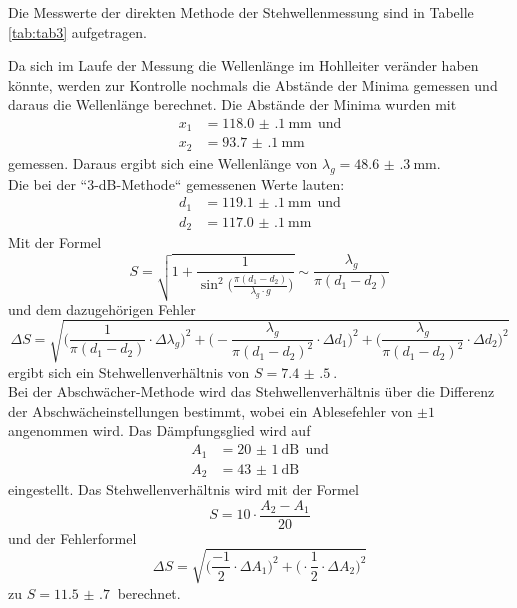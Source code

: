 Die Messwerte der direkten Methode der Stehwellenmessung sind in Tabelle \ref{tab:tab3} aufgetragen.

Da sich im Laufe der Messung die Wellenlänge im Hohlleiter veränder haben könnte, werden zur Kontrolle nochmals
die Abstände der Minima gemessen und daraus die Wellenlänge berechnet. Die Abstände der Minima wurden mit
\begin{align*}
  x_1&=\SI{118.0(1)}{\mm}\:\:\text{und}\\
  x_2&=\SI{93.7(1)}{\mm}
\end{align*}
gemessen.
Daraus ergibt sich eine Wellenlänge von $\lambda_g=\SI{48.6(3)}{\mm}$.\\
Die bei der “3-dB-Methode“ gemessenen Werte lauten:
 \begin{align*}
   d_\text{1}&=\SI{119.1(1)}{\mm} \:\:\text{und}\\
   d_\text{2}&=\SI{117.0(1)}{\mm}
 \end{align*}
 Mit der Formel
 \begin{equation}
   S=\sqrt{1+\frac{1}{\sin^2\Big(\frac{\pi (d_1 - d_2)}{\lambda_g \cdot g}\Big)}}\sim\frac{\lambda_g}{\pi (d_1 - d_2)}
 \end{equation}
 und dem dazugehörigen Fehler
 \begin{equation}
   \Delta S=\sqrt{\Big(\frac{1}{\pi(d_1 - d_2)}\cdot\Delta\lambda_g\Big)^2+\Big(-\frac{\lambda_g}{\pi{(d_1 - d_2)^2}}\cdot\Delta d_1\Big)^2+
   \Big(\frac{\lambda_g}{\pi(d_1 - d_2)^2}\cdot\Delta d_2\Big)^2}
 \end{equation}
 ergibt sich ein Stehwellenverhältnis von $S=\SI{7.4(5)}{}$.\\

 Bei der Abschwächer-Methode wird das Stehwellenverhältnis über die Differenz der Abschwächeinstellungen bestimmt, wobei
 ein Ablesefehler von $\pm 1$ angenommen wird.
 Das Dämpfungsglied wird auf
 \begin{align*}
   A_1&=\SI{20(1)}{\dB} \:\:\text{und}\\
   A_2&=\SI{43(1)}{\dB}
 \end{align*}
 eingestellt. Das Stehwellenverhältnis wird mit der Formel
 \begin{equation}
   S=10\cdot\frac{A_2 - A_1}{20}
 \end{equation}
 und der Fehlerformel
 \begin{equation}
   \Delta S=\sqrt{\Big(\frac{-1}{2}\cdot\Delta A_1\Big)^2+\Big(\cdot{\frac{1}{2}\cdot\Delta A_2}\Big)^2  }
 \end{equation}
zu $S=\SI{11.5(7)}{}$ berechnet.
